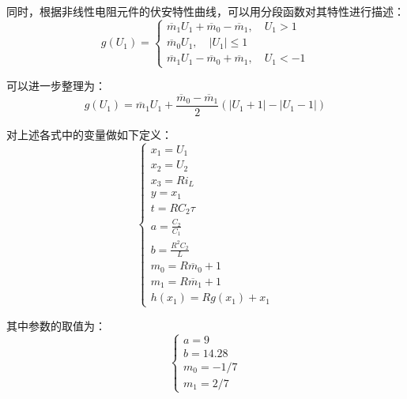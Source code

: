 \documentclass[UTF8]{article}
\begin{document}
同时，根据非线性电阻元件的伏安特性曲线，可以用分段函数对其特性进行描述：
\begin{equation*}
	g(U_1) = 
	\begin{cases}
		\overline{m}_1U_1 + \overline{m}_0 - \overline{m}_1, \quad U_1 > 1 \\
		\overline{m}_0U_1, \quad |U_1| \le 1 \\
		\overline{m}_1U_1 - \overline{m}_0 + \overline{m}_1, \quad U_1 < -1
	\end{cases}
\end{equation*}

可以进一步整理为：
\begin{equation*}
	g(U_1) = \overline{m}_1U_1 + \frac{\overline{m}_0 - \overline{m}_1}{2}(|U_1 + 1| - |U_1 - 1|)
\end{equation*}

对上述各式中的变量做如下定义：
\begin{equation*}
	\begin{cases}
		x_1 = U_1 \\
		x_2 = U_2 \\
		x_3 = Ri_L \\
		y = x_1 \\
		t = RC_2\tau \\
		a = \frac{C_2}{C_1} \\
		b = \frac{R^2C_2}{L} \\
		m_0 = R\overline{m}_0 + 1 \\
		m_1 = R\overline{m}_1 + 1 \\
		h(x_1) = Rg(x_1) + x_1
	\end{cases}
\end{equation*}

其中参数的取值为：
\begin{equation*}
	\begin{cases}
		a = 9 \\
		b = 14.28 \\
		m_0 = -1/7 \\
		m_1 = 2/7
	\end{cases}
\end{equation*}
\end{document}
